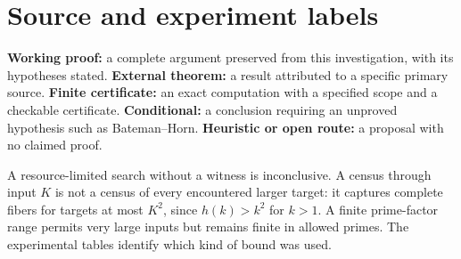 \section{Source and experiment labels}
\textbf{Working proof:} a complete argument preserved from this investigation,
with its hypotheses stated. \textbf{External theorem:} a result attributed to a
specific primary source. \textbf{Finite certificate:} an exact computation with a
specified scope and a checkable certificate. \textbf{Conditional:} a conclusion
requiring an unproved hypothesis such as Bateman--Horn. \textbf{Heuristic or open
route:} a proposal with no claimed proof.

A resource-limited search without a witness is inconclusive. A census through
input $K$ is not a census of every encountered larger target: it captures complete
fibers for targets at most $K^2$, since $h(k)>k^2$ for $k>1$. A finite prime-factor
range permits very large inputs but remains finite in allowed primes. The
experimental tables identify which kind of bound was used.
